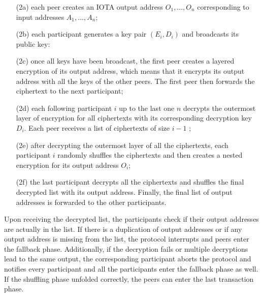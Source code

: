 \begin{enumerate}
  \item[(2a)] each peer creates an IOTA output address $O_{1},...,O_{n}$ corresponding to input addresses $A_{1},..., A_{n}$;  
  \item[(2b)] each participant generates a key pair $(E_{i},D_{i})$ and broadcasts its public key:
  \item[(2c)] once all keys have been broadcast, the first peer creates a layered encryption of its output address, which means 
  that it encrypts its output address with all the keys of the other peers. The first peer then forwards the ciphertext to the next participant;
  \item[(2d)] each following participant $i$ up to the last one $n$ decrypts the outermost layer of encryption for all ciphertexts 
  with its corresponding decryption key $D_{i}$. Each peer receives a list of ciphertexts of size $i -1$ ;
  \item[(2e)] after decrypting the outermost layer of all the ciphertexts, each participant $i$ randomly shuffles the ciphertexts 
  and then creates a nested encryption for its output address $O_{i}$;
  \item[(2f)] the last participant decrypts all the ciphertexts and
 shuffles the final decrypted list with its output address. Finally, the final list of output addresses is forwarded to 
 the other participants.
\end{enumerate}

Upon receiving the decrypted list, the participants check if
their output addresses are actually in the list. If there is a duplication of output addresses 
or if any output address is missing from
the list, the protocol interrupts and peers enter the fallback phase. Additionally, if the decryption fails or multiple decryptions
lead to the same output, the corresponding participant aborts the
protocol and notifies every participant and all the
participants enter the fallback phase as well. If the shuffling phase unfolded correctly, the peers can enter the last transaction phase.

